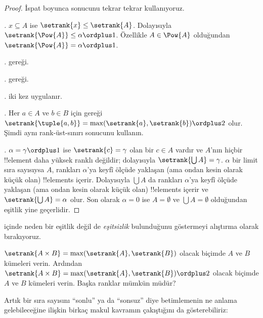 \begin{proof}
İspat boyunca  sonucunu tekrar tekrar
kullanıyoruz.

\emph{.} $x\subseteq A$ ise
$\setrank{x}\leq\setrank{A}$. Dolayısıyla
$\setrank{\Pow{A}}\leq\alpha\ordplus 1$. Özellikle
$A\in\Pow{A}$ olduğundan $\setrank{\Pow{A}}=\alpha\ordplus 1$.

\emph{.}  gereği.

\emph{.}  gereği.

\emph{.}  iki kez uygulanır.

\emph{.} Her $a\in A$ ve $b\in B$ için
 gereği
$\setrank{\tuple{a,b}}=\max(\setrank{a},\setrank{b})\ordplus 2$ olur.
Şimdi aynı rank-üst-sınırı sonucunu kullanın.

\emph{.} $\alpha=\gamma\ordplus 1$ ise
$\setrank{c}=\gamma$ olan bir $c\in A$ vardır ve $A$'nın hiçbir
!!{element} daha yüksek ranklı değildir; dolayısıyla
$\setrank{\bigcup A}=\gamma$. $\alpha$ bir limit sıra sayısıysa $A$,
rankları $\alpha$'ya keyfî ölçüde yaklaşan (ama ondan kesin olarak küçük
olan) !!{element}s içerir. Dolayısıyla $\bigcup A$ da rankları $\alpha$'ya
keyfî ölçüde yaklaşan (ama ondan kesin olarak küçük olan) !!{element}s
içerir ve $\setrank{\bigcup A}=\alpha$ olur. Son olarak $\alpha=0$ ise
$A=\emptyset$ ve $\bigcup A=\emptyset$ olduğundan eşitlik yine geçerlidir.
\end{proof}
\noindent
{} içinde neden bir eşitlik değil de
\emph{eşitsizlik} bulunduğunu göstermeyi alıştırma olarak bırakıyoruz.

\begin{prob}
$\setrank{A\times B}=\max(\setrank{A},\setrank{B})$ olacak biçimde $A$ ve
$B$ kümeleri verin. Ardından
$\setrank{A\times B}=\max(\setrank{A},\setrank{B})\ordplus 2$ olacak
biçimde $A$ ve $B$ kümeleri verin. Başka ranklar mümkün müdür?
\end{prob}

Artık bir sıra sayısını ``sonlu'' ya da ``sonsuz'' diye betimlemenin ne
anlama gelebileceğine ilişkin birkaç makul kavramın çakıştığını da
gösterebiliriz:

